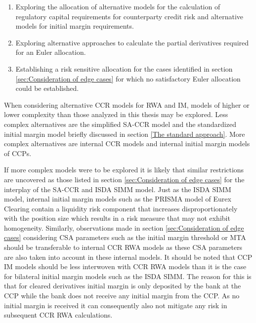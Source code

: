 \documentclass[../Thesis_AHoecherl.tex]{subfiles}
\begin{document}
\begin{enumerate}
    \item Exploring the allocation of alternative models for the calculation of regulatory capital requirements for counterparty credit risk and alternative models for initial margin requirements.
    \item Exploring alternative approaches to calculate the partial derivatives required for an Euler allocation.
    \item Establishing a risk sensitive allocation for the cases  identified in section \ref{sec:Consideration of edge cases} for which no satisfactory Euler allocation could be established.
\end{enumerate}

When considering alternative \gls{CCR} models for \gls{RWA} and \gls{IM}, models of higher or lower complexity than those analyzed in this thesis may be explored. 
Less complex alternatives are the simplified \gls{SA-CCR} model \cite[Article 281 and following]{CRRII} and the standardized initial margin model briefly discussed in section \ref{The standard approach}. 
More complex alternatives are internal \gls{CCR} models \cite[CRE 53]{CRE} and internal initial margin models of \glspl{CCP}.

If more complex models were to be explored it is likely that similar restrictions are uncovered as those listed in section \ref{sec:Consideration of edge cases} for the interplay of the \gls{SA-CCR} and \gls{ISDA SIMM} model.
Just as the \gls{ISDA SIMM} model, internal initial margin models such as the PRISMA model of Eurex Clearing contain a liquidity risk component that increases disproportionately with the position size \cite[Section 3.5]{EurexDec2012} which results in a risk measure that may not exhibit homogeneity.
Similarly, observations made in section \ref{sec:Consideration of edge cases} considering \gls{CSA} parameters such as the initial margin threshold or \gls{MTA} should be transferable to internal \gls{CCR} \gls{RWA} models as these \gls{CSA} parameters are also taken into account in these internal models.
It should be noted that \gls{CCP} \gls{IM} models should be less interwoven with \gls{CCR} \gls{RWA} models than it is the case for bilateral initial margin models such as the \gls{ISDA SIMM}. 
The reason for this is that for cleared derivatives initial margin is only deposited by the bank at the \gls{CCP} while the bank does not receive any initial margin from the \gls{CCP}.
As no initial margin is received it can consequently also not mitigate any risk in subsequent \gls{CCR} \gls{RWA} calculations.
\end{document}
